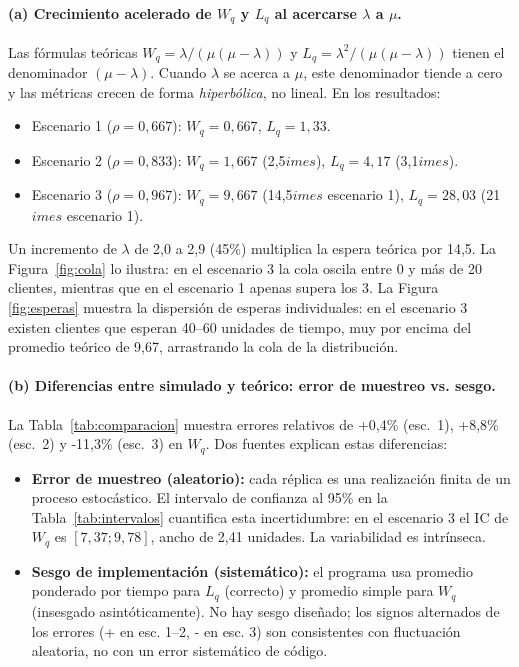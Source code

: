 \documentclass[11pt,a4paper]{article}
\begin{document}
\paragraph{(a) Crecimiento acelerado de $W_q$ y $L_q$ al acercarse $\lambda$ a $\mu$.}
Las fórmulas teóricas $W_q = \lambda/(\mu(\mu-\lambda))$ y $L_q = \lambda^2/(\mu(\mu-\lambda))$
tienen el denominador $(\mu-\lambda)$. Cuando $\lambda$ se acerca a $\mu$, este
denominador tiende a cero y las métricas crecen de forma \emph{hiperbólica}, no
lineal. En los resultados:
\begin{itemize}
    \item Escenario 1 ($\rho=0,667$): $W_q=0,667$, $L_q=1,33$.
    \item Escenario 2 ($\rho=0,833$): $W_q=1,667$ (2,5$	imes$), $L_q=4,17$ (3,1$	imes$).
    \item Escenario 3 ($\rho=0,967$): $W_q=9,667$ (14,5$	imes$ escenario 1), $L_q=28,03$ (21$	imes$ escenario 1).
\end{itemize}
Un incremento de $\lambda$ de 2,0 a 2,9 (45\%) multiplica la espera teórica por 14,5.
La Figura~\ref{fig:cola} lo ilustra: en el escenario 3 la cola oscila entre 0 y más
de 20 clientes, mientras que en el escenario 1 apenas supera los 3. La Figura
\ref{fig:esperas} muestra la dispersión de esperas individuales: en el escenario 3
existen clientes que esperan 40--60 unidades de tiempo, muy por encima del
promedio teórico de 9,67, arrastrando la cola de la distribución.

\paragraph{(b) Diferencias entre simulado y teórico: error de muestreo vs. sesgo.}
La Tabla~\ref{tab:comparacion} muestra errores relativos de +0,4\% (esc.~1),
+8,8\% (esc.~2) y -11,3\% (esc.~3) en $W_q$. Dos fuentes explican estas diferencias:
\begin{itemize}
    \item \textbf{Error de muestreo (aleatorio):} cada réplica es una realización finita
de un proceso estocástico. El intervalo de confianza al 95\% en la
    Tabla~\ref{tab:intervalos} cuantifica esta incertidumbre: en el escenario 3 el IC
    de $W_q$ es $[7,37; 9,78]$, ancho de 2,41 unidades. La variabilidad es intrínseca.
    \item \textbf{Sesgo de implementación (sistemático):} el programa usa promedio
    ponderado por tiempo para $L_q$ (correcto) y promedio simple para $W_q$
    (insesgado asintóticamente). No hay sesgo diseñado; los signos alternados
de los errores (+ en esc. 1--2, - en esc. 3) son consistentes con fluctuación
    aleatoria, no con un error sistemático de código.
\end{itemize}
\end{document}
